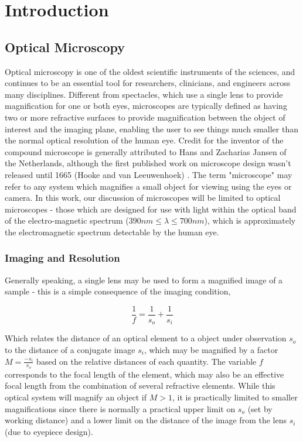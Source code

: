 \chapter{Introduction}

\section{Optical Microscopy}

Optical microscopy is one of the oldest scientific instruments of the sciences, and continues to be an essential tool for researchers, clinicians, and engineers across many disciplines. Different from spectacles, which use a single lens to provide magnification for one or both eyes, microscopes are typically defined as having two or more refractive surfaces to provide magnification between the object of interest and the imaging plane, enabling the user to see things much smaller than the normal optical resolution of the human eye. Credit for the inventor of the compound microscope is generally attributed to Hans and Zacharias Jansen of the Netherlands, although the first published work on microscope design wasn't released until 1665 (Hooke and van Leeuwenhoek) \cite{natureMilestones,hookeMicrographica}. The term "microscope" may refer to any system which magnifies a small object for viewing using the eyes or camera. In this work, our discussion of microscopes will be limited to optical microscopes - those which are designed for use with light within the optical band of the electro-magnetic spectrum ($390nm \leq \lambda \leq 700nm$), which is approximately the electromagnetic spectrum detectable by the human eye.

\subsection{Imaging and Resolution}
Generally speaking, a single lens may be used to form a magnified image of a sample - this is a simple consequence of the imaging condition,

\begin{equation}
\frac{1}{f} = \frac{1}{s_o} + \frac{1}{s_i}
\end{equation}

Which relates the distance of an optical element to a object under observation $s_o$ to the distance of a conjugate image $s_i$, which may be magnified by a factor $M = \frac{-s_i}{s_o}$ based on the relative distances of each quantity. The variable $f$ corresponds to the focal length of the element, which may also be an effective focal length from the combination of several refractive elements. While this optical system will magnify an object if $M > 1$, it is practically limited to smaller magnifications since there is normally a practical upper limit on $s_o$ (set by working distance) and a lower limit on the distance of the image from the lens $s_i$ (due to eyepiece design).

